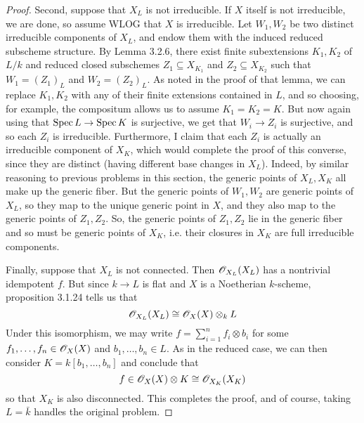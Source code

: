 \begin{proof}
	Second, suppose that $X_L$ is not irreducible. If $X$ itself is not irreducible, we are done, so assume WLOG that $X$ is irreducible. Let $W_1,W_2$ be two distinct irreducible components of $X_L$, and endow them with the induced reduced subscheme structure. By Lemma 3.2.6, there exist finite subextensions $K_1,K_2$ of $L/k$ and reduced closed subschemes $Z_1 \subseteq X_{K_1}$ and $Z_2 \subseteq X_{K_2}$ such that $W_1 = (Z_1)_L$ and $W_2 = (Z_2)_L$. As noted in the proof of that lemma, we can replace $K_1,K_2$ with any of their finite extensions contained in $L$, and so choosing, for example, the compositum allows us to assume $K_1 = K_2 = K$. But now again using that $\operatorname{Spec} L \to \operatorname{Spec} K$ is surjective, we get that $W_i \to Z_i$ is surjective, and so each $Z_i$ is irreducible. Furthermore, I claim that each $Z_i$ is actually an irreducible component of $X_K$, which would complete the proof of this converse, since they are distinct (having different base changes in $X_L$). Indeed, by similar reasoning to previous problems in this section, the generic points of $X_L,X_K$ all make up the generic fiber. But the generic points of $W_1,W_2$ are generic points of $X_L$, so they map to the unique generic point in $X$, and they also map to the generic points of $Z_1,Z_2$. So, the generic points of $Z_1,Z_2$ lie in the generic fiber and so must be generic points of $X_K$, i.e. their closures in $X_K$ are full irreducible components.
	
	Finally, suppose that $X_L$ is not connected. Then $\mathscr{O}_{X_L}(X_L)$ has a nontrivial idempotent $f$. But since $k \to L$ is flat and $X$ is a Noetherian $k$-scheme, proposition 3.1.24 tells us that
	\[ \mathscr{O}_{X_L}(X_L) \cong \mathscr{O}_X(X) \otimes_k L \]
	Under this isomorphism, we may write $f = \sum_{i=1}^n f_i \otimes b_i$ for some $f_1,\ldots,f_n \in \mathscr{O}_X(X)$ and $b_1,\ldots,b_n \in L$. As in the reduced case, we can then consider $K = k[b_1,\ldots,b_n]$ and conclude that
	\[ f \in \mathscr{O}_X(X) \otimes K \cong \mathscr{O}_{X_K}(X_K) \]
	so that $X_K$ is also disconnected. This completes the proof, and of course, taking $L = \bar{k}$ handles the original problem.
\end{proof}
